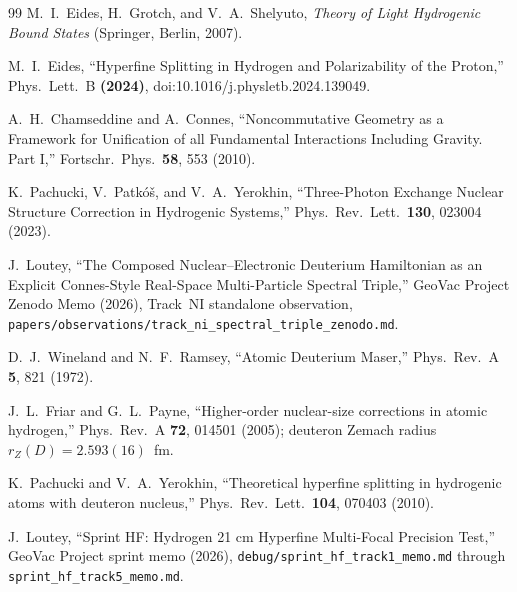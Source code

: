 \documentclass[twocolumn,prc,amsmath,amssymb,superscriptaddress]{revtex4-2}
\begin{document}
\begin{thebibliography}{99}
M.~I.~Eides, H.~Grotch, and V.~A.~Shelyuto,
\emph{Theory of Light Hydrogenic Bound States}
(Springer, Berlin, 2007).

M.~I.~Eides,
``Hyperfine Splitting in Hydrogen and Polarizability of the Proton,''
Phys.~Lett.~B \textbf{(2024)}, doi:10.1016/j.physletb.2024.139049.

A.~H.~Chamseddine and A.~Connes,
``Noncommutative Geometry as a Framework for Unification of all
Fundamental Interactions Including Gravity. Part I,''
Fortschr.~Phys.~\textbf{58}, 553 (2010).

K.~Pachucki, V.~Patkó\v{s}, and V.~A.~Yerokhin,
``Three-Photon Exchange Nuclear Structure Correction in Hydrogenic
Systems,''
Phys.~Rev.~Lett.~\textbf{130}, 023004 (2023).

J.~Loutey, ``The Composed Nuclear--Electronic Deuterium Hamiltonian as
an Explicit Connes-Style Real-Space Multi-Particle Spectral Triple,''
GeoVac Project Zenodo Memo (2026), Track~NI standalone observation,
\texttt{papers/observations/track\_ni\_spectral\_triple\_zenodo.md}.

D.~J.~Wineland and N.~F.~Ramsey,
``Atomic Deuterium Maser,''
Phys.~Rev.~A \textbf{5}, 821 (1972).

J.~L.~Friar and G.~L.~Payne,
``Higher-order nuclear-size corrections in atomic hydrogen,''
Phys.~Rev.~A \textbf{72}, 014501 (2005); deuteron Zemach radius
$r_Z(D) = 2.593(16)$~fm.

K.~Pachucki and V.~A.~Yerokhin,
``Theoretical hyperfine splitting in hydrogenic atoms with deuteron
nucleus,''
Phys.~Rev.~Lett.~\textbf{104}, 070403 (2010).

J.~Loutey, ``Sprint HF: Hydrogen 21 cm Hyperfine Multi-Focal Precision
Test,'' GeoVac Project sprint memo (2026),
\texttt{debug/sprint\_hf\_track1\_memo.md} through
\texttt{sprint\_hf\_track5\_memo.md}.

\end{thebibliography}
\end{document}
